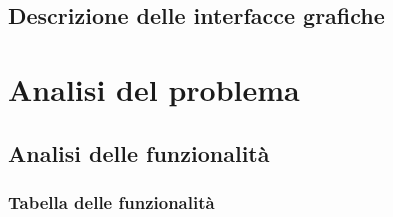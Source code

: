 \documentclass[a4paper]{article}
\begin{document}
\newpage

\subsection{Descrizione delle interfacce grafiche}

\newpage

\section{Analisi del problema}

\subsection{Analisi delle funzionalità}

\subsubsection{Tabella delle funzionalità}
\end{document}
